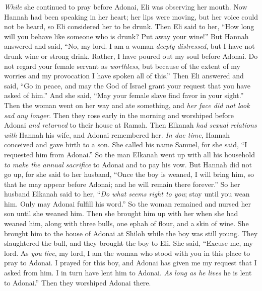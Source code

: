 \begin{biblechapter}
\verse \textit{While} she continued to pray before Adonai, Eli was observing her mouth.
\verse Now Hannah had been speaking in her heart; her lips were moving, but her voice could not be heard, so Eli considered her to be drunk.
\verse Then Eli said to her, “How long will you behave like someone who is drunk? Put away your wine!”
\verse But Hannah answered and said, “No, my lord. I am a woman \textit{deeply distressed}, but I have not drunk wine or strong drink. Rather, I have poured out my soul before Adonai.
\verse Do not regard your female servant as \textit{worthless}, but because of the extent of my worries and my provocation I have spoken all of this.”
\verse Then Eli answered and said, “Go in peace, and may the God of Israel grant your request that you have asked of him.”
\verse And she said, “May your female slave find favor in your sight.” Then the woman went on her way and ate something, and \textit{her face did not look sad any longer}.
 Then they rose early in the morning and worshiped before Adonai \textit{and returned} to their house at Ramah. Then Elkanah \textit{had sexual relations with} Hannah his wife, and Adonai remembered her.
\verse \textit{In due time}, Hannah conceived and gave birth to a son. She called his name Samuel, for she said, “I requested him from Adonai.”
\verse So the man Elkanah went up with all his household \textit{to make the annual sacrifice} to Adonai and to pay his vow.
\verse But Hannah did not go up, for she said to her husband, “Once the boy is weaned, I will bring him, so that he may appear before Adonai; and he will remain there forever.”
\verse So her husband Elkanah said to her, “\textit{Do what seems right to you}; stay until you wean him. Only may Adonai fulfill his word.” So the woman remained and nursed her son until she weaned him.
\verse Then she brought him up with her when she had weaned him, along with three bulls, one ephah of flour, and a skin of wine. She brought him to the house of Adonai at Shiloh while the boy was still young.
\verse They slaughtered the bull, and they brought the boy to Eli.
\verse She said, “Excuse me, my lord. As \textit{you live}, my lord, I am the woman who stood with you in this place to pray to Adonai.
\verse I prayed for this boy, and Adonai has given me my request that I asked from him.
\verse I in turn have lent him to Adonai. \textit{As long as he lives} he is lent to Adonai.” Then they worshiped Adonai there.
\end{biblechapter}

